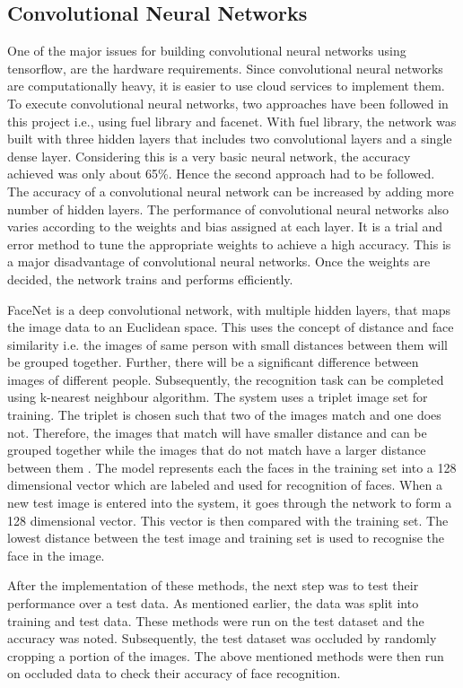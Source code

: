 \documentclass[conference]{IEEEtran}
\begin{document}
\begin{enumerate}
\subsection{Convolutional Neural Networks} 
\label{subsec: 4c Convolutional Neural Networks}
One of the major issues for building convolutional neural networks using tensorflow, are the hardware requirements. Since convolutional neural networks are computationally heavy, it is easier to use cloud services to implement them. To execute convolutional neural networks, two approaches have been followed in this project i.e., using fuel library and facenet\cite{schroff2015facenet}. With fuel library, the network was built with three hidden layers that includes two convolutional layers and a single dense layer. Considering this is a very basic neural network, the accuracy achieved was only about 65\%. Hence the second approach had to be followed. The accuracy of a convolutional neural network can be increased by adding more number of hidden layers. The performance of convolutional neural networks also varies according to the weights and bias assigned at each layer. It is a trial and error method to tune the appropriate weights to achieve a high accuracy. This is a major disadvantage of convolutional neural networks. Once the weights are decided, the network trains and performs efficiently. 

FaceNet is a deep convolutional network, with multiple hidden layers, that maps the image data to an Euclidean space. This uses the concept of distance and face similarity i.e. the images of same person with small distances between them will be grouped together. Further, there will be a significant difference between images of different people. Subsequently, the recognition task can be completed using k-nearest neighbour algorithm. The system uses a triplet image set for training. The triplet is chosen such that two of the images match and one does not. Therefore, the images that match will have smaller distance and can be grouped together while the images that do not match have a larger distance between them \cite{schroff2015facenet}. The model represents each the faces in the training set into a 128 dimensional vector which are labeled and used for recognition of faces. When a new test image is entered into the system, it goes through the network to form a 128 dimensional vector. This vector is then compared with the training set. The lowest distance between the test image and training set is used to recognise the face in the image. 

After the implementation of these methods, the next step was to test their performance over a test data. As mentioned earlier, the data was split into training and test data. These methods were run on the test dataset and the accuracy was noted. Subsequently, the test dataset was occluded by randomly cropping a portion of the images. The above mentioned methods were then run on occluded data to check their accuracy of face recognition.


\end{enumerate}
\end{document}
